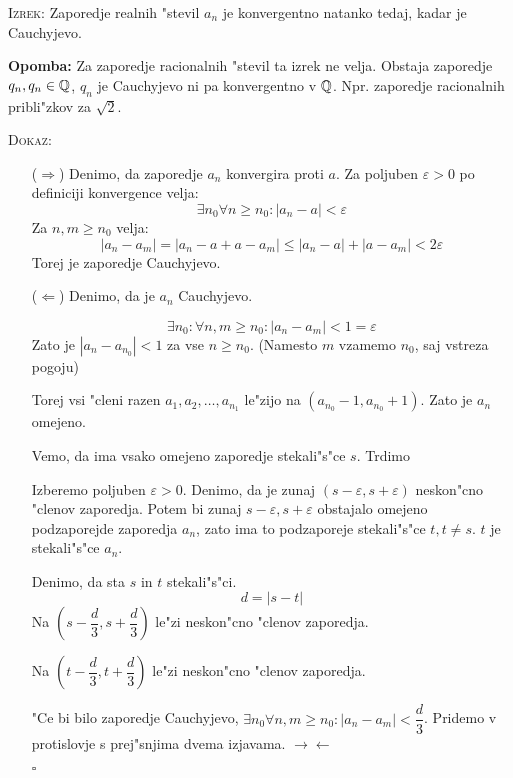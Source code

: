 \textsc{Izrek:} Zaporedje realnih "stevil $a_n$ je konvergentno natanko tedaj, kadar je Cauchyjevo.

\textbf{Opomba:} Za zaporedje racionalnih "stevil ta izrek ne velja. Obstaja zaporedje $q_n, q_n \in \mathbb{Q}$, $q_n$ je Cauchyjevo ni pa konvergentno v $\mathbb{Q}$. Npr. zaporedje racionalnih pribli"zkov za $\sqrt{2}$.

\textsc{Dokaz}:
\begin{itemize}
	\item[($\Rightarrow$)] Denimo, da zaporedje $a_n$ konvergira proti $a$. Za poljuben $\varepsilon > 0$ po definiciji konvergence velja:
	\begin{equation*}
	\exists n_0 \forall n \geq n_0: |a_n - a| < \varepsilon
	\end{equation*}
	Za $n, m \geq n_0$ velja:
	\begin{equation*}
	|a_n - a_m| = |a_n - a + a - a_m| \leq |a_n - a| + |a - a_m| < 2 \varepsilon
	\end{equation*}
	Torej je zaporedje Cauchyjevo.
	
	\item[($\Leftarrow$)] Denimo, da je $a_n$ Cauchyjevo.
	
	\begin{equation*}
	\exists n_0: \forall n, m \geq n_0: |a_n - a_m| < 1 = \varepsilon
	\end{equation*}
	Zato je $|a_n - a_{n_0}| < 1$ za vse $n \geq n_0$. (Namesto $m$ vzamemo $n_0$, saj vstreza pogoju)
	
	Torej vsi "cleni razen $a_1, a_2, \ldots, a_{n_1}$ le"zijo na $(a_{n_0} - 1, a_{n_0} + 1)$. Zato je $a_n$ omejeno.
	
	Vemo, da ima vsako omejeno zaporedje stekali"s"ce $s$. Trdimo 
	
	Izberemo poljuben $\varepsilon > 0$. Denimo, da je zunaj $(s - \varepsilon, s + \varepsilon)$ neskon"cno "clenov zaporedja. Potem bi zunaj $s - \varepsilon, s + \varepsilon$ obstajalo omejeno podzaporejde zaporedja $a_n$, zato ima to podzaporeje stekali"s"ce $t, t \neq s$. $t$ je stekali"s"ce $a_n$.
	
	
	Denimo, da sta $s$ in $t$ stekali"s"ci.
	\begin{equation*}
	d = |s - t|
	\end{equation*}
	Na $(s - \dfrac{d}{3}, s + \dfrac{d}{3})$ le"zi neskon"cno "clenov zaporedja.
	
	Na $(t - \dfrac{d}{3}, t + \dfrac{d}{3})$ le"zi neskon"cno "clenov zaporedja.
	
	"Ce bi bilo zaporedje Cauchyjevo, $\exists n_0 \forall n, m \geq n_0: |a_n - a_m| < \dfrac{d}{3}$. Pridemo v protislovje s prej"snjima dvema izjavama. $\rightarrow \leftarrow$
	
	\hfill $\square$
\end{itemize}

